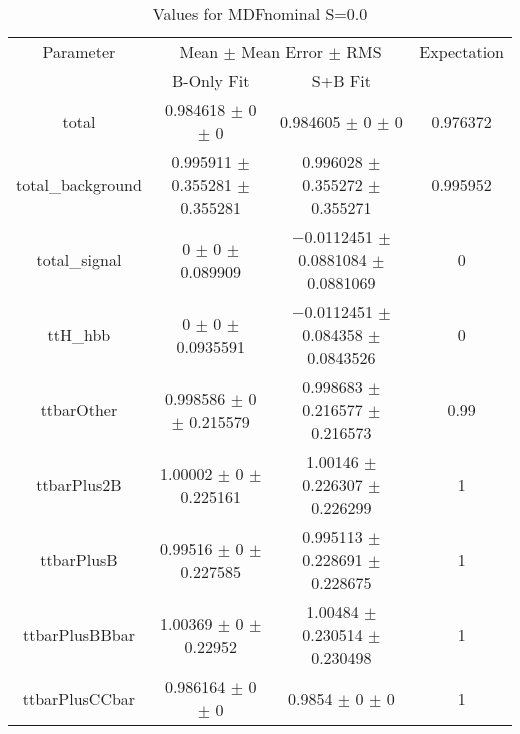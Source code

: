 \begin{table}
\centering
\caption{Values for MDFnominal S=0.0}
\begin{tabular}{cccc}
\toprule
Parameter & \multicolumn{2}{c}{Mean $\pm$ Mean Error $\pm$ RMS} & Expectation\\
 & B-Only Fit & S+B Fit & \\
\midrule
total & \num{0.984618} $\pm$ \num{0} $\pm$ \num{0} & \num{0.984605} $\pm$ \num{0} $\pm$ \num{0} & \num{0.976372}\\
total\_background & \num{0.995911} $\pm$ \num{0.355281} $\pm$ \num{0.355281} & \num{0.996028} $\pm$ \num{0.355272} $\pm$ \num{0.355271} & \num{0.995952}\\
total\_signal & \num{0} $\pm$ \num{0} $\pm$ \num{0.089909} & \num{-0.0112451} $\pm$ \num{0.0881084} $\pm$ \num{0.0881069} & \num{0}\\
ttH\_hbb & \num{0} $\pm$ \num{0} $\pm$ \num{0.0935591} & \num{-0.0112451} $\pm$ \num{0.084358} $\pm$ \num{0.0843526} & \num{0}\\
ttbarOther & \num{0.998586} $\pm$ \num{0} $\pm$ \num{0.215579} & \num{0.998683} $\pm$ \num{0.216577} $\pm$ \num{0.216573} & \num{0.99}\\
ttbarPlus2B & \num{1.00002} $\pm$ \num{0} $\pm$ \num{0.225161} & \num{1.00146} $\pm$ \num{0.226307} $\pm$ \num{0.226299} & \num{1}\\
ttbarPlusB & \num{0.99516} $\pm$ \num{0} $\pm$ \num{0.227585} & \num{0.995113} $\pm$ \num{0.228691} $\pm$ \num{0.228675} & \num{1}\\
ttbarPlusBBbar & \num{1.00369} $\pm$ \num{0} $\pm$ \num{0.22952} & \num{1.00484} $\pm$ \num{0.230514} $\pm$ \num{0.230498} & \num{1}\\
ttbarPlusCCbar & \num{0.986164} $\pm$ \num{0} $\pm$ \num{0} & \num{0.9854} $\pm$ \num{0} $\pm$ \num{0} & \num{1}\\
\bottomrule
\end{tabular}
\end{table}